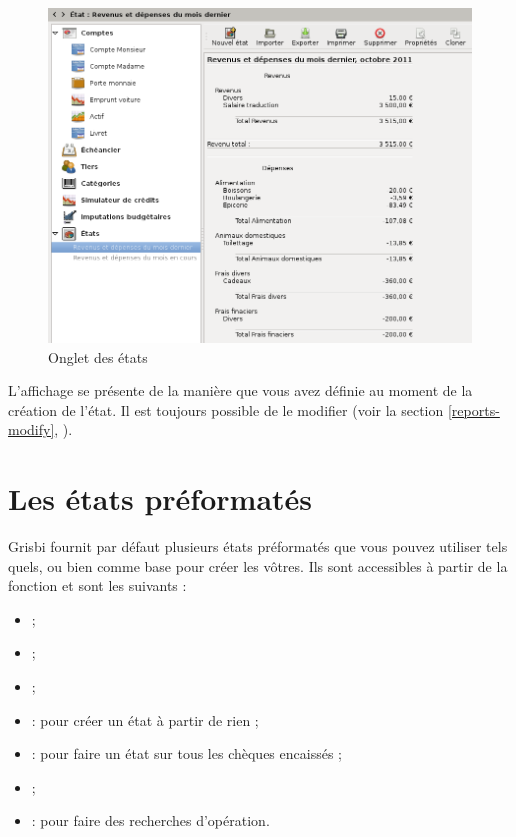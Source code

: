 \ifIllustration
\begin{figure}[ht]
\begin{center}
\includegraphics[scale=0.5]{image/screenshot/reports_display}
\end{center}
\caption{Onglet des états}
\label{reports-display-img}
\end{figure}
\fi

L'affichage se présente de la manière que vous avez définie au moment de la création de l'état. Il est toujours possible de le modifier (voir la section \vref{reports-modify}, ).


\section{Les états préformatés}


Grisbi fournit par défaut plusieurs états préformatés que vous pouvez utiliser tels quels, ou bien comme base pour créer les vôtres. Ils sont accessibles à partir de la fonction  et sont les suivants :

\begin{itemize}
	\item {} ;
	\item {} ;
	\item {} ;
	\item {} : pour créer un état à partir de rien ;
	\item {} : pour faire un état sur tous les chèques encaissés ;
	\item {} ;
	\item {} : pour faire des recherches d'opération.
\end{itemize}


